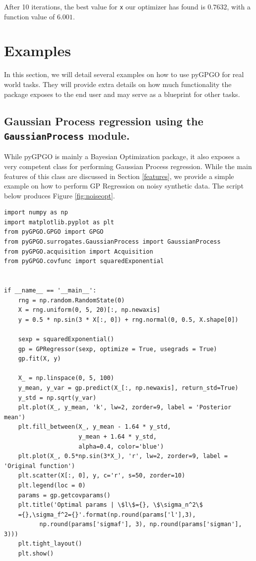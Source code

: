 \documentclass[10pt,a4paper,twoside]{book}
\begin{document}
After 10 iterations, the best value for \texttt{x} our optimizer has found is $0.7632$, with a function value of $6.001$.

\section{Examples}

In this section, we will detail several examples on how to use pyGPGO for real world tasks. They will provide extra details on how much functionality the package exposes to the end user and may serve as a blueprint for other tasks.


\subsection{Gaussian Process regression using the \texttt{GaussianProcess} module.}

While pyGPGO is mainly a Bayesian Optimization package, it also exposes a very competent class for performing Gaussian Process regression. While the main features of this class are discussed in Section \ref{features}, we provide a simple example on how to perform GP Regression on noisy synthetic data. The script below produces Figure \ref{fig:noiseopt}.

\begin{verbatim}
import numpy as np
import matplotlib.pyplot as plt
from pyGPGO.GPGO import GPGO
from pyGPGO.surrogates.GaussianProcess import GaussianProcess
from pyGPGO.acquisition import Acquisition
from pyGPGO.covfunc import squaredExponential


if __name__ == '__main__':
    rng = np.random.RandomState(0)
    X = rng.uniform(0, 5, 20)[:, np.newaxis]
    y = 0.5 * np.sin(3 * X[:, 0]) + rng.normal(0, 0.5, X.shape[0])

    sexp = squaredExponential()
    gp = GPRegressor(sexp, optimize = True, usegrads = True)
    gp.fit(X, y)

    X_ = np.linspace(0, 5, 100)
    y_mean, y_var = gp.predict(X_[:, np.newaxis], return_std=True)
    y_std = np.sqrt(y_var)
    plt.plot(X_, y_mean, 'k', lw=2, zorder=9, label = 'Posterior mean')
    plt.fill_between(X_, y_mean - 1.64 * y_std,
                     y_mean + 1.64 * y_std,
                     alpha=0.4, color='blue')
    plt.plot(X_, 0.5*np.sin(3*X_), 'r', lw=2, zorder=9, label = 'Original function')
    plt.scatter(X[:, 0], y, c='r', s=50, zorder=10)
    plt.legend(loc = 0)
    params = gp.getcovparams()
    plt.title('Optimal params | \$l\$={}, \$\sigma_n^2\$
    ={},\sigma_f^2={}'.format(np.round(params['l'],3),
    	  np.round(params['sigmaf'], 3), np.round(params['sigman'], 3)))
    plt.tight_layout()
    plt.show()
\end{verbatim}
\end{document}
